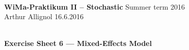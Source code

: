 \documentclass[a4,11pt]{article}\usepackage[]{graphicx}\usepackage[]{color}
\newcounter{ka}
\begin{document}
\renewcommand{\baselinestretch}{1}

\hrulefill\\
{\bf WiMa-Praktikum II -- Stochastic} \hspace{\fill} Summer term 2016\\
Arthur Allignol \hspace{\fill} 16.6.2016\\[-1.2ex]
\mbox{}\hrulefill\\
\newline \renewcommand{\baselinestretch}{1}
\setcounter{ka}{0} \vspace{-0.5cm}



\begin{center}
\large{{\bf Exercise Sheet 6 --- Mixed-Effects Model}}
\end{center}
\end{document}

